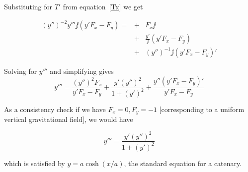\documentclass{article}
\begin{document}
Substituting for $T'$ from equation~\ref{Tx} we get

\begin{eqnarray}
  (y'')^{-2}y'''\jj(y'F_x-F_y)=&+&F_x\jj\nonumber\\
  &+&\frac{y'}{\jj}(y'F_x-F_y)\\
  &+&(y'')^{-1}\jj(y'F_x -F_y)'\nonumber
\end{eqnarray}
  

Solving for $y'''$ and simplifying gives
\begin{equation}
  y'''=\frac{(y'')^2F_x}{y'F_x-F_y}
  + \frac{y'(y'')^2}{1+(y')^2}
  + \frac{y''(y'F_x-F_y)'}{y'F_x-F_y}
\end{equation}

As a consistency check if we have $F_x=0,F_y=-1$ [corresponding to a
  uniform vertical gravitational field], we would have

\begin{equation}
  y'''=\frac{y'(y'')^2}{1+(y')^2}
\end{equation}

which is satisfied by $y=a\cosh(x/a)$, the standard equation for a
catenary.




\end{document}
